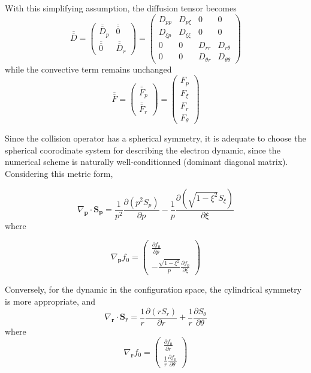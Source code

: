 With this simplifying assumption, the diffusion tensor becomes \[
\overline{\overline{D}}=\left(\begin{array}{ll}
\overline{\overline{D}}_{p} & \overline{\overline{0}}\\
\overline{\overline{0}} & \overline{\overline{D}}_{r}\end{array}\right)=\left(\begin{array}{llll}
D_{pp} & D_{p\xi} & 0 & 0\\
D_{\xi p} & D_{\xi\xi} & 0 & 0\\
0 & 0 & D_{rr} & D_{r\theta}\\
0 & 0 & D_{\theta r} & D_{\theta\theta}\end{array}\right)\]
 while the convective term remains unchanged \[
\overline{\overline{F}}=\left(\begin{array}{l}
\overline{\overline{F}}_{p}\\
\overline{\overline{F}}_{r}\end{array}\right)=\left(\begin{array}{l}
F_{p}\\
F_{\xi}\\
F_{r}\\
F_{\theta}\end{array}\right)\]


Since the collision operator has a spherical symmetry, it is adequate
to choose the spherical coorodinate system for describing the electron
dynamic, since the numerical scheme is naturally well-conditionned
(dominant diagonal matrix). Considering this metric form,

\[
\nabla_{\mathbf{p}}\cdot\mathbf{S}_{\mathbf{p}}=\frac{1}{p^{2}}\frac{\partial\left(p^{2}S_{p}\right)}{\partial p}-\frac{1}{p}\frac{\partial\left(\sqrt{1-\xi^{2}}S_{\xi}\right)}{\partial\xi}\]
 where

\[
\nabla_{\mathbf{p}}f_{0}=\left(\begin{array}{l}
\frac{\partial f_{0}}{\partial p}\\
-\frac{\sqrt{1-\xi^{2}}}{p}\frac{\partial f_{0}}{\partial\xi}\end{array}\right)\]


Conversely, for the dynamic in the configuration space, the cylindrical
symmetry is more appropriate, and \[
\nabla_{\mathbf{r}}\cdot\mathbf{S}_{\mathbf{r}}=\frac{1}{r}\frac{\partial\left(rS_{r}\right)}{\partial r}+\frac{1}{r}\frac{\partial S_{\theta}}{\partial\theta}\]
 where \[
\nabla_{\mathbf{r}}f_{0}=\left(\begin{array}{l}
\frac{\partial f_{0}}{\partial r}\\
\frac{1}{r}\frac{\partial f_{0}}{\partial\theta}\end{array}\right)\]


